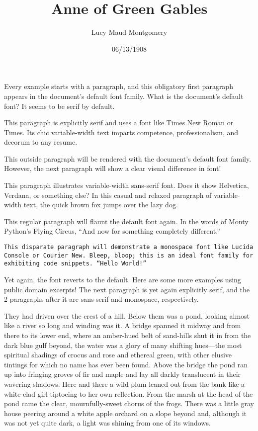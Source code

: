 \documentclass[a4paper]{article}
\title{Anne of Green Gables}
\author{Lucy Maud Montgomery}
\date{06/13/1908}
\begin{document}
\maketitle

Every example starts with a paragraph, and this obligatory first paragraph appears in the document's default font family. What is the document's default font? It seems to be serif by default.

\textrm{This paragraph is explicitly serif and uses a font like Times New Roman or Times. Its chic variable-width text imparts competence, professionalism, and decorum to any resume.}

This outside paragraph will be rendered with the document's default font family. However, the next paragraph will show a clear visual difference in font!

\textsf{This paragraph illustrates variable-width sans-serif font. Does it show Helvetica, Verdana, or something else? In this casual and relaxed paragraph of variable-width text, the quick brown fox jumps over the lazy dog.}

This regular paragraph will flaunt the default font again. In the words of Monty Python's Flying Circus, ``And now for something completely different.''

\texttt{This disparate paragraph will demonstrate a monospace font like Lucida Console or Courier New. Bleep, bloop; this is an ideal font family for exhibiting code snippets. ``Hello World!''}

Yet again, the font reverts to the default. Here are some more examples using public domain excerpts! The next paragraph is yet again explicitly serif, and the 2 paragraphs after it are sans-serif and monospace, respectively.

\textrm{They had driven over the crest of a hill. Below them was a pond, looking almost like a river so long and winding was it. A bridge spanned it midway and from there to its lower end, where an amber-hued belt of sand-hills shut it in from the dark blue gulf beyond, the water was a glory of many shifting hues---the most spiritual shadings of crocus and rose and ethereal green, with other elusive tintings for which no name has ever been found. Above the bridge the pond ran up into fringing groves of fir and maple and lay all darkly translucent in their wavering shadows. Here and there a wild plum leaned out from the bank like a white-clad girl tiptoeing to her own reflection. From the marsh at the head of the pond came the clear, mournfully-sweet chorus of the frogs. There was a little gray house peering around a white apple orchard on a slope beyond and, although it was not yet quite dark, a light was shining from one of its windows.}
\end{document}
